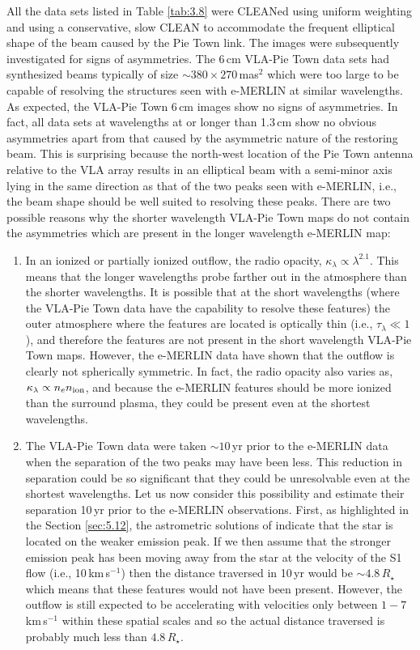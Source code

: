 All the data sets listed in Table \ref{tab:3.8} were CLEANed using uniform weighting and using a conservative, slow CLEAN to accommodate the frequent elliptical shape of the beam caused by the Pie Town link. The images were subsequently investigated for signs of asymmetries. The 6\,cm VLA-Pie Town data sets had synthesized beams typically of size $\sim 380\times 270$\,mas$^2$ which were too large to be capable of resolving the structures seen with e-MERLIN at similar wavelengths. As expected, the VLA-Pie Town 6\,cm images show no signs of asymmetries. In fact, all data sets at wavelengths at or longer than 1.3\,cm show no obvious asymmetries apart from that caused by the asymmetric nature of the restoring beam. This is surprising because the north-west location of the Pie Town antenna relative to the VLA array results in an elliptical beam with a semi-minor axis lying in the same direction as that of the two peaks seen with e-MERLIN, i.e., the beam shape should be well suited to resolving these peaks. There are two possible reasons why the shorter wavelength VLA-Pie Town maps do not contain the asymmetries which are present in the longer wavelength e-MERLIN map:
\begin{enumerate}
\item In an ionized or partially ionized outflow, the radio opacity, $\kappa _{\lambda} \propto \lambda ^{2.1}$. This means that the longer wavelengths probe farther out in the atmosphere than the shorter wavelengths. It is possible that at the short wavelengths (where the VLA-Pie Town data have the capability to resolve these features) the outer atmosphere where the features are located is optically thin (i.e., $\tau _{\lambda}\ll 1$), and therefore the features are not present in the short wavelength VLA-Pie Town maps. However, the e-MERLIN data have shown that the outflow is clearly not spherically symmetric. In fact, the radio opacity also varies as, $\kappa _{\lambda} \propto n_{e}n_{\rm{ion}}$, and because the e-MERLIN features should be more ionized than the surround plasma, they could be present even at the shortest wavelengths.
\item The VLA-Pie Town data were taken $\sim 10$\,yr prior to the e-MERLIN data when the separation of the two peaks may have been less. This reduction in separation could be so significant that they could be unresolvable even at the shortest wavelengths. Let us now consider this possibility and estimate their separation  10\,yr prior to the e-MERLIN observations. First, as highlighted in the Section \ref{sec:5.12}, the astrometric solutions of \cite{harper_2008} indicate that the star is located on the weaker emission peak. If we then assume that the stronger emission peak has been moving away from the star at the velocity of the S1 flow (i.e., 10\,km\,s$^{-1}$) then the distance traversed in 10\,yr would be $\sim 4.8\,R_{\star}$ which means that these features would not have been present. However, the outflow is still expected to be accelerating with velocities only between $1-7$\,km\,s$^{-1}$ within these spatial scales \citep{carpenter_1997} and so the actual distance traversed is probably much less than $4.8\,R_{\star}$.
\end{enumerate}

